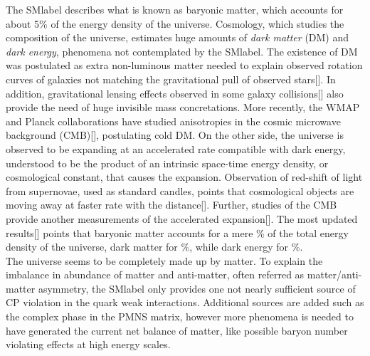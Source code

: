 The \acrshort{SMlabel} describes what is known as baryonic matter, which accounts for about 5\% of the energy density of the universe. Cosmology, which studies the composition of the universe, estimates huge amounts of \textit{dark matter} (DM) and \textit{dark energy}, phenomena not contemplated by the \acrshort{SMlabel}. The existence of DM was postulated as extra non-luminous matter needed to explain observed rotation curves of galaxies not matching the gravitational pull of observed stars[]. In addition, gravitational lensing effects observed in some galaxy collisions[] also provide the need of huge invisible mass concretations. More recently, the WMAP and Planck collaborations have studied anisotropies in the cosmic microwave background (CMB)[], postulating cold DM. On the other side, the universe is observed to be expanding at an accelerated rate compatible with dark energy, understood to be the product of an intrinsic space-time energy density, or cosmological constant, that causes the expansion. Observation of red-shift of light from supernovae, used as standard candles, points that cosmological objects are moving away at faster rate with the distance[]. Further, studies of the CMB provide another measurements of the accelerated expansion[]. The most updated results[] points that baryonic matter accounts for a mere \% of the total energy density of the universe, dark matter for \%, while dark energy for \%.\\

The universe seems to be completely made up by matter. To explain the imbalance in abundance of matter and anti-matter, often referred as matter/anti-matter asymmetry, the \acrshort{SMlabel} only provides one not nearly sufficient source of CP violation in the quark weak interactions. Additional sources are added such as the complex phase in the PMNS matrix, however more phenomena is needed to have generated the current net balance of matter, like possible baryon number violating effects at high energy scales.\\

